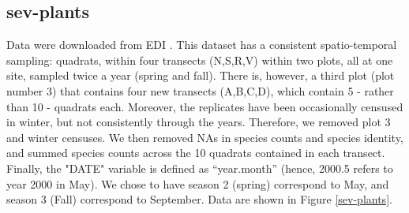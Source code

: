 \documentclass[11pt, oneside]{article}
\begin{document}
\subsection{sev-plants}
Data were downloaded from EDI \citep{sev-plants}.
This dataset has a consistent spatio-temporal sampling: quadrats, within four transects (N,S,R,V) within two plots, all at one site, sampled twice a year (spring and fall). 
There is, however, a third plot (plot number 3) that contains four new transects (A,B,C,D), which contain 5 - rather than 10 - quadrats each. 
Moreover, the replicates have been occasionally censused in winter, but not consistently through the years. 
Therefore, we removed plot 3 and winter censuses.
We then removed NAs in species counts and species identity, and summed species counts across the 10 quadrats contained in each transect. 
Finally, the "DATE" variable is defined as ``year.month'' (hence, 2000.5 refers to year 2000 in May). 
We chose to have season 2 (spring) correspond to May, and season 3 (Fall) correspond to September.
Data are shown in Figure \ref{sev-plants}.
\end{document}

